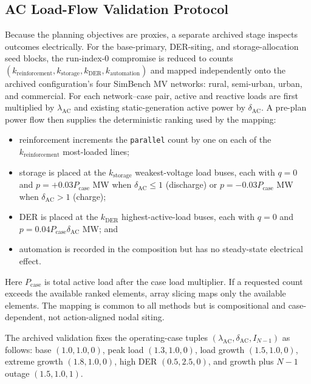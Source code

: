 \documentclass[energies,article,submit,moreauthors]{Definitions/mdpi}
\providecommand{\tightlist}{\setlength{\itemsep}{0pt}\setlength{\parskip}{0pt}}
\begin{document}
\subsection{AC Load-Flow Validation Protocol}\label{ac-load-flow-validation-protocol}

Because the planning objectives are proxies, a separate archived stage inspects outcomes electrically. For the base-primary, DER-siting, and storage-allocation seed blocks, the run-index-0 compromise is reduced to counts \((k_{\mathrm{reinforcement}},k_{\mathrm{storage}},k_{\mathrm{DER}},k_{\mathrm{automation}})\) and mapped independently onto the archived configuration's four SimBench MV networks: rural, semi-urban, urban, and commercial. For each network--case pair, active and reactive loads are first multiplied by \(\lambda_{\mathrm{AC}}\) and existing static-generation active power by \(\delta_{\mathrm{AC}}\). A pre-plan power flow then supplies the deterministic ranking used by the mapping:

\begin{itemize}
\tightlist
\item
  reinforcement increments the \texttt{parallel} count by one on each of the \(k_{\mathrm{reinforcement}}\) most-loaded lines;
\item
  storage is placed at the \(k_{\mathrm{storage}}\) weakest-voltage load buses, each with \(q=0\) and \(p=+0.03P_{\mathrm{case}}\) MW when \(\delta_{\mathrm{AC}}\leq1\) (discharge) or \(p=-0.03P_{\mathrm{case}}\) MW when \(\delta_{\mathrm{AC}}>1\) (charge);
\item
  DER is placed at the \(k_{\mathrm{DER}}\) highest-active-load buses, each with \(q=0\) and \(p=0.04P_{\mathrm{case}}\delta_{\mathrm{AC}}\) MW; and
\item
  automation is recorded in the composition but has no steady-state electrical effect.
\end{itemize}

Here \(P_{\mathrm{case}}\) is total active load after the case load multiplier. If a requested count exceeds the available ranked elements, array slicing maps only the available elements. The mapping is common to all methods but is compositional and case-dependent, not action-aligned nodal siting.

The archived validation fixes the operating-case tuples \((\lambda_{\mathrm{AC}},\delta_{\mathrm{AC}},I_{N-1})\) as follows: base \((1.0,1.0,0)\), peak load \((1.3,1.0,0)\), load growth \((1.5,1.0,0)\), extreme growth \((1.8,1.0,0)\), high DER \((0.5,2.5,0)\), and growth plus \(N-1\) outage \((1.5,1.0,1)\).
\end{document}
